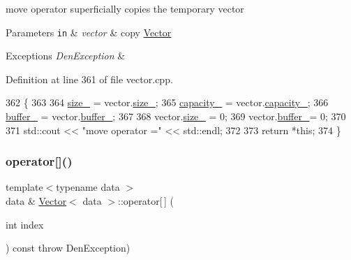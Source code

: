 move operator  superficially copies the temporary vector 


\begin{DoxyParams}[1]{Parameters}
\mbox{\tt in}  & {\em vector} & copy \hyperlink{classVector}{Vector} \\
\hline
\end{DoxyParams}

\begin{DoxyExceptions}{Exceptions}
{\em Den\+Exception} & \\
\hline
\end{DoxyExceptions}


Definition at line 361 of file vector.\+cpp.


\begin{DoxyCode}
362         \{
363 
364             \hyperlink{classVector_a3c70fa478530a90177f2a7e7621ee688}{size\_} = vector.\hyperlink{classVector_a3c70fa478530a90177f2a7e7621ee688}{size\_};
365             \hyperlink{classVector_ad75911bb39018821f0e2911b6905b7ec}{capacity\_} = vector.\hyperlink{classVector_ad75911bb39018821f0e2911b6905b7ec}{capacity\_};
366             \hyperlink{classVector_a22db58ae9e92c6014e8ac657804a035a}{buffer\_} = vector.\hyperlink{classVector_a22db58ae9e92c6014e8ac657804a035a}{buffer\_};
367 
368             vector.\hyperlink{classVector_a3c70fa478530a90177f2a7e7621ee688}{size\_} = 0;
369             vector.\hyperlink{classVector_a22db58ae9e92c6014e8ac657804a035a}{buffer\_}= 0;
370 
371             std::cout << \textcolor{stringliteral}{"move operator ="} << std::endl;
372 
373             \textcolor{keywordflow}{return} *\textcolor{keyword}{this};
374         \}
\end{DoxyCode}
\mbox{\label{classVector_ad3af3ead835defe8350ec5ddb68d225b}} 
\subsubsection{\texorpdfstring{operator[]()}{operator[]()}}
{\footnotesize\ttfamily template$<$typename data $>$ \\
data \& \hyperlink{classVector}{Vector}$<$ data $>$\+::operator\mbox{[}$\,$\mbox{]} (\begin{DoxyParamCaption}\item[{int}]{index }\end{DoxyParamCaption}) const throw  Den\+Exception) }



